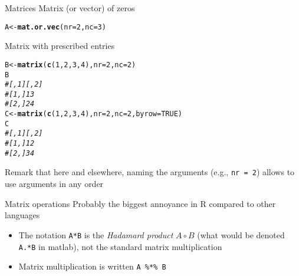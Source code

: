 \documentclass[aspectratio=169]{beamer}\usepackage[]{graphicx}\usepackage[]{xcolor}
\makeatletter
\newcommand{\hlnum}[1]{\textcolor[rgb]{0.686,0.059,0.569}{#1}}%
\newcommand{\hlcom}[1]{\textcolor[rgb]{0.678,0.584,0.686}{\textit{#1}}}%
\newcommand{\hldef}[1]{\textcolor[rgb]{0.345,0.345,0.345}{#1}}%
\newcommand{\hlkwb}[1]{\textcolor[rgb]{0.69,0.353,0.396}{#1}}%
\newcommand{\hlkwc}[1]{\textcolor[rgb]{0.333,0.667,0.333}{#1}}%
\newcommand{\hlkwd}[1]{\textcolor[rgb]{0.737,0.353,0.396}{\textbf{#1}}}%
\newenvironment{kframe}{%
 \def\at@end@of@kframe{}%
 \ifinner\ifhmode%
  \def\at@end@of@kframe{\end{minipage}}%
  \begin{minipage}{\columnwidth}%
 \fi\fi%
 \def\FrameCommand##1{\hskip\@totalleftmargin \hskip-\fboxsep
 \colorbox{shadecolor}{##1}\hskip-\fboxsep
     \hskip-\linewidth \hskip-\@totalleftmargin \hskip\columnwidth}%
 \MakeFramed {\advance\hsize-\width
   \@totalleftmargin\z@ \linewidth\hsize
   \@setminipage}}%
 {\par\unskip\endMakeFramed%
 \at@end@of@kframe}
\newenvironment{knitrout}{}{} %
\makeatother
\begin{document}
\begin{frame}[fragile]{Matrices}
Matrix (or vector) of zeros
\begin{knitrout}
\color{fgcolor}\begin{kframe}
\begin{alltt}
\hldef{A} \hlkwb{<-} \hlkwd{mat.or.vec}\hldef{(}\hlkwc{nr} \hldef{=} \hlnum{2}\hldef{,} \hlkwc{nc} \hldef{=} \hlnum{3}\hldef{)}
\end{alltt}
\end{kframe}
\end{knitrout}

Matrix with prescribed entries

\begin{knitrout}
\color{fgcolor}\begin{kframe}
\begin{alltt}
\hldef{B} \hlkwb{<-} \hlkwd{matrix}\hldef{(}\hlkwd{c}\hldef{(}\hlnum{1}\hldef{,}\hlnum{2}\hldef{,}\hlnum{3}\hldef{,}\hlnum{4}\hldef{),} \hlkwc{nr} \hldef{=} \hlnum{2}\hldef{,} \hlkwc{nc} \hldef{=} \hlnum{2}\hldef{)}
\hldef{B}
\hlcom{#      [,1] [,2]}
\hlcom{# [1,]    1    3}
\hlcom{# [2,]    2    4}
\hldef{C} \hlkwb{<-} \hlkwd{matrix}\hldef{(}\hlkwd{c}\hldef{(}\hlnum{1}\hldef{,}\hlnum{2}\hldef{,}\hlnum{3}\hldef{,}\hlnum{4}\hldef{),} \hlkwc{nr} \hldef{=} \hlnum{2}\hldef{,} \hlkwc{nc} \hldef{=} \hlnum{2}\hldef{,} \hlkwc{byrow} \hldef{=} \hlnum{TRUE}\hldef{)}
\hldef{C}
\hlcom{#      [,1] [,2]}
\hlcom{# [1,]    1    2}
\hlcom{# [2,]    3    4}
\end{alltt}
\end{kframe}
\end{knitrout}

Remark that here and elsewhere, naming the arguments (e.g., \texttt{nr = 2}) allows to use arguments in any order
\end{frame}

\begin{frame}{Matrix operations}
Probably the biggest annoyance in R compared to other languages
\vfill
\begin{itemize}
\item The notation \texttt{A*B} is the \textit{Hadamard product} $A\circ B$ (what would be denoted \texttt{A.*B} in matlab), not the standard matrix multiplication
\vfill
\item Matrix multiplication is written \texttt{A \%*\% B}
\end{itemize}
\end{frame}
\end{document}
